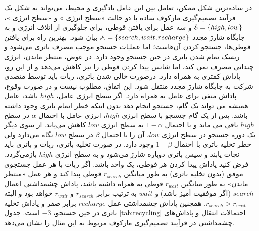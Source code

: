 در ساده‌ترین شکل ممکن، تعامل بین این عامل یادگیری و محیط، می‌تواند به شکل یک فرآیند تصمیم‌گیری مارکوف ساده با دو حالت «سطح انرژی » و «سطح انرژی »، 
${\EuScript{S} = \{high, low\}}$ 
و سه عمل  برای یافتن قوطی،  برای جلوگیری از اتلاف انرژی و  به جایگاه شارژ مجدد 
$\EuScript{A}=\{search, wait, recharge\}$
بیان شود. بهترین راه برای یافتن قوطی‌ها، جستجو کردن آن‌هاست؛ اما عملیات جستجو موجب مصرف باتری می‌شود و ریسک تمام شدن باتری در حین جستجو وجود دارد. در عوض، منتظر ماندن، انرژی چندانی مصرف نمی کند، اما شانس پیدا کردن قوطی را نیز کاهش می‌دهد و از این رو، پاداش کمتری به همراه دارد. درصورت خالی شدن باتری، ربات باید توسط متصدی شرکت به جایگاه شارژ مجدد منتقل شود. این اتفاق، مطلوب نیست و در صورت وقوع، پاداش منفی برای عامل به همراه دارد. 
اگر سطح انرژی عامل، $high$  باشد، عامل همیشه می تواند یک گام، جستجو انجام دهد بدون اینکه خطر اتمام باتری وجود داشته باشد.
پس از یک گام جستجو با سطح انرژی $high$، انرژی عامل با احتمال
 $\alpha$
 در سطح $high$ باقی می ماند و با احتمال 
 $1-\alpha$
 به سطح انرژی $low$ کاهش می‌یابد. از سوی دیگر یک دوره
جستجو در سطح انرژی $low$، آن را با احتمال $\beta$ در سطح $low$ نگاه می‌دارد ولی خطر تخلیه باتری با احتمال $1-\beta$ وجود دارد. در صورت تخلیه باتری، ربات و باتری باید نجات یابند و سپس باتری دوباره شارژ می‌شود و به سطح انرژی $high$ بازمی‌گردد. 
فرض کنید پاداش پیدا کردن هر قوطی، یک واحد باشد. اگر ربات با هر عمل جستجوی موفق (بدون تخلیه باتری) به طور میانگین $r_{search}$ قوطی پیدا کند و هر عمل «منتظر ماندن» به طور میانگین $r_{wait}$ قوطی به همراه داشته باشد، 
 پاداش چشمداشتی اعمال $search$ (اگر موفقیت آمیز باشد)  و $wait$ به ترتیب برابر $r_{search}$  و 
$r_{wait}$
خواهد بود و البته $r_{search} > r_{wait}$. همچنین پاداش چشمداشتی عمل 
   $recharge$
   برابر صفر و پاداش تخلیه باتری در حین جستجو، 
   $-3$
است. جدول 
\ref{tab:recycling}
 احتمالات انتقال و پاداش‌های چشمداشتی در فرآیند تصمیم‌گیری مارکوف مربوط به این مثال را نشان می‌دهد\cite{suttonbook}.


